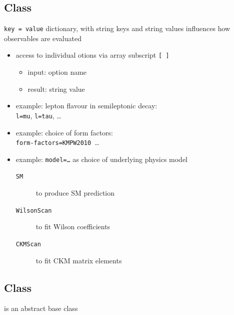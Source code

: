 \subsection{Class }

\texttt{key = value} dictionary, with string keys and string values
influences how observables are evaluated

\begin{itemize}
    \item access to individual otions via array subscript {\texttt{[\,]}}
    \begin{itemize}
        \item input: option name
        \item result: string value
    \end{itemize}
    \item example: lepton flavour in semileptonic decay:\\
        \texttt{l=mu}, \texttt{l=tau}, \dots
    \item example: choice of form factors:\\
        \texttt{form-factors=KMPW2010}\, \dots
    \item example: \texttt{model=\dots} as choice of underlying physics model
    \begin{description}
        \item[\texttt{SM}] to produce SM prediction
        \item[\texttt{WilsonScan}] to fit Wilson coefficients
        \item[\texttt{CKMScan}] to fit CKM matrix elements
    \end{description}
\end{itemize}

\subsection{Class }

 is an abstract base class\\

